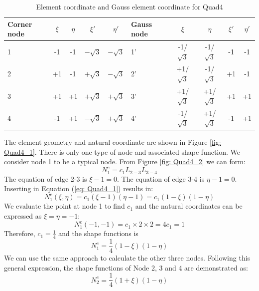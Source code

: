 \begin{table}
	\centering
	\caption{Element coordinate and Gauss element coordinate for Quad4}
	\label{tab: Quad4}
	\begin{tabular}{p{1cm}ccccp{1cm}cccc}			
		\hline
		Corner node\centering& $\xi$& $\eta$& $\xi'$& $\eta'$& Gauss node\centering& $\xi$& $\eta$& $\xi'$& $\eta'$ \\
		\hline
		1\centering& -1& -1& $-\sqrt{3}$& $-\sqrt{3}$& 1'\centering& -1/$\sqrt{3}$& -1/$\sqrt{3}$& -1& -1 \\
		2\centering& +1& -1& $+\sqrt{3}$& $-\sqrt{3}$& 2'\centering& +1/$\sqrt{3}$& -1/$\sqrt{3}$& +1& -1 \\
		3\centering& +1& +1& $+\sqrt{3}$& $+\sqrt{3}$& 3'\centering& +1/$\sqrt{3}$& +1/$\sqrt{3}$& +1& +1\\
		4\centering& -1& +1& $-\sqrt{3}$& $+\sqrt{3}$& 4'\centering& -1/$\sqrt{3}$& +1/$\sqrt{3}$& -1& +1\\
		\hline
	\end{tabular}
\end{table}		
The element geometry and natural coordinate are shown in Figure \ref{fig: Quad4_1}. There is only one type of node and associated shape function. We consider node 1 to be a typical node. From Figure \ref{fig: Quad4_2} we can form:
\begin{equation} \label{eq: Quad4_1}
N_1^e = c_1L_{2-3}L_{3-4}
\end{equation}
The equation of edge 2-3 is $\xi - 1 = 0$. The equation of edge 3-4 is $\eta - 1 = 0$. Inserting in Equation (\ref{eq: Quad4_1}) results in:
\begin{equation}
N_1^e\left(\xi, \eta\right) = c_1 \left( \xi -1 \right) \left( \eta - 1\right) = c_1 \left(1 - \xi\right) \left( 1 - \eta \right)
\end{equation}
We evaluate the point at node 1 to find $c_1$ and the natural coordinates can be expressed as $\xi = \eta = -1$:
\begin{equation}
N_1^e \left(-1, -1 \right) = c_1 \times 2 \times 2 = 4c_1 = 1
\end{equation}
Therefore, $c_1 = \frac{1}{4}$ and the shape functions is
\begin{equation}
N_1^e = \frac{1}{4} \left(1 - \xi\right) \left( 1 - \eta\right)
\end{equation}
We can use the same approach to calculate the other three nodes. Following this general expression, the shape functions of Node 2, 3 and 4 are demonstrated as:
\begin{equation}
N_2^e = \frac{1}{4} \left(1 + \xi\right) \left( 1 - \eta\right)
\end{equation}
